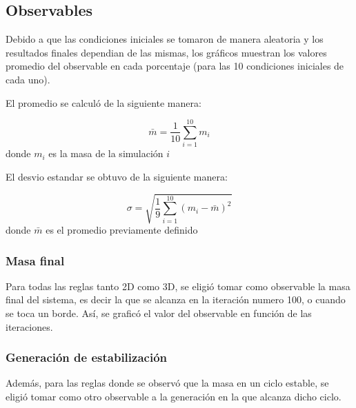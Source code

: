 \subsection{Observables}
Debido a que las condiciones iniciales se tomaron de manera aleatoria y los resultados finales dependian de las mismas, los gráficos muestran los valores promedio del observable en cada porcentaje (para las 10 condiciones iniciales de cada uno).

El promedio se calculó de la siguiente manera:

\begin{equation}
    \label{eq:mean}
    \bar{m} = \frac{1}{10} \sum_{i=1}^{10} m_i
\end{equation}
donde $m_i$ es la masa de la simulación $i$

El desvio estandar se obtuvo de la siguiente manera:

\begin{equation}
    \label{eq:std}
    \sigma = \sqrt{\frac{1}{9} \sum_{i=1}^{10} (m_i - \bar{m})^2}
\end{equation}
donde $\bar{m}$ es el promedio previamente definido

\subsubsection{Masa final}
Para todas las reglas tanto 2D como 3D, se eligió tomar como observable la masa final del sistema, es decir la que se alcanza en la iteración numero 100, o cuando se toca un borde.
Así, se graficó el valor del observable en función de las iteraciones.
\subsubsection{Generación de estabilización}
Además, para las reglas donde se observó que la masa en un ciclo estable, se eligió tomar como otro observable a la generación en la que alcanza dicho ciclo.